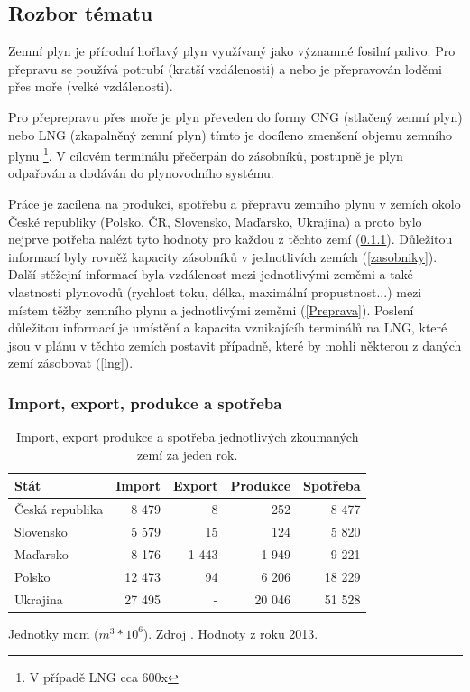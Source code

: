 \documentclass[a4paper,11pt]{article}
\begin{document}
\subsection{Rozbor tématu}\label{Rozbor}

Zemní plyn je přírodní hořlavý plyn využívaný jako významné fosilní palivo.
Pro přepravu se používá potrubí (kratší vzdálenosti) a nebo je 
přepravován loděmi přes moře (velké vzdálenosti).

Pro přeprepravu přes moře je plyn převeden do formy CNG (stlačený zemní plyn) nebo
LNG (zkapalněný zemní plyn) tímto je docíleno zmenšení objemu zemního plynu \footnote{V případě LNG cca 600x}.
V cílovém terminálu přečerpán do zásobníků, postupně je plyn odpařován a dodáván do plynovodního systému.

\vline

Práce je zacílena na produkci, spotřebu a přepravu zemního plynu v zemích okolo
České republiky (Polsko, ČR, Slovensko, Maďarsko, Ukrajina) a proto bylo nejprve potřeba
nalézt tyto hodnoty pro každou z těchto zemí (\ref{Zeme}). 
Důležitou informací byly rovněž kapacity zásobníků v jednotlivích zemích (\ref{zasobniky}).
Další stěžejní informací byla vzdálenost mezi jednotlivými zeměmi a také vlastnosti
plynovodů (rychlost toku, délka, maximální propustnost...)
mezi místem těžby zemního plynu a jednotlivými zeměmi (\ref{Preprava}).
Poslení důležitou informací je umístění a kapacita vznikajícíh terminálů na LNG,
které jsou v plánu v těchto zemích postavit případně, které by mohli některou z
daných zemí zásobovat (\ref{lng}).



\subsubsection{Import, export, produkce a spotřeba}\label{Zeme}
\begin{table}[h!]
\begin{center}
\begin{tabular}{|l|r|r|r|r|}
    \hline
    Stát 			& Import 	& Export & Produkce & Spotřeba \\
    \hline 
    Česká republika	& 8 479 		& 8 		& 252	& 8 477\\ 
    Slovensko 		& 5 579		& 15		& 124	& 5 820\\
    Maďarsko 		& 8 176		& 1 443	& 1 949	& 9 221\\
    Polsko 			& 12 473 	& 94 	& 6 206	& 18 229\\
    Ukrajina 		& 27 495 	& -		& 20 046 & 51 528 \\ \hline
\end{tabular}
\caption{Import, export produkce a spotřeba jednotlivých zkoumaných zemí za jeden rok.}
Jednotky mcm ($m^3 * 10^6$).  Zdroj \cite{IEA}. Hodnoty z roku 2013.
\label{rocni}
\end{center}
\end{table}
\end{document}
